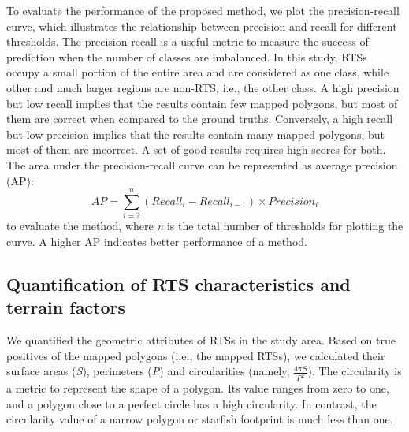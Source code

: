 \documentclass[preprint,12pt,authoryear]{elsarticle}
\begin{document}
To evaluate the performance of the proposed method, we plot the precision-recall curve, which illustrates the relationship between precision and recall for different thresholds. The precision-recall is a useful metric to measure the success of prediction when the number of classes are imbalanced. In this study, RTSs occupy a small portion of the entire area and are considered as one class, while other and much larger regions are non-RTS, i.e., the other class. A high precision but low recall implies that the results contain few mapped polygons, but most of them are correct when compared to the ground truths. Conversely, a high recall but low precision implies that the results contain many mapped polygons, but most of them are incorrect. A set of good results requires high scores for both. The area under the precision-recall curve can be represented as average precision (AP):
\begin{equation}
AP=\sum_{i=2}^{n} (Recall_i - Recall_{i-1})\times Precision_i 
\label{equ_ap}
\end{equation}
to evaluate the method, where \emph{n} is the total number of thresholds for plotting the curve. A higher AP indicates better performance of a method.


\subsection{Quantification of RTS characteristics and terrain factors}
\label{subsec_quantify_rts}

We quantified the geometric attributes of RTSs in the study area. Based on true positives of the mapped polygons (i.e., the mapped RTSs), we calculated their surface areas (\emph{S}), perimeters (\emph{P}) and circularities (namely, $\frac{4 \pi S}{P^2} $). The circularity is a metric to represent the shape of a polygon. Its value ranges from zero to one, and a polygon close to a perfect circle has a high circularity. In contrast, the circularity value of a narrow polygon or starfish footprint is much less than one. 
\end{document}

